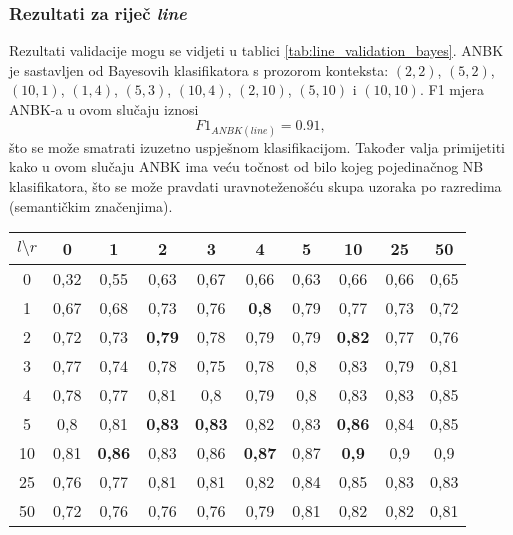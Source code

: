 \documentclass[10pt, a4paper]{article}
\begin{document}
\subsubsection{Rezultati za riječ \emph{line}} 
Rezultati validacije mogu se vidjeti u tablici \ref{tab:line_validation_bayes}.
ANBK je sastavljen od Bayesovih klasifikatora s prozorom konteksta: $(2,2)$,
$(5,2)$, $(10,1)$, $(1,4)$, $(5,3)$, $(10,4)$, $(2,10)$, $(5,10)$ i $(10,10)$.
F1 mjera ANBK-a u ovom slučaju iznosi
\begin{equation}
\label{eq:F1_ansambl_line}
F1_{ANBK(line)} = 0.91,
\end{equation}
što se može smatrati izuzetno uspješnom klasifikacijom. 
Također valja primijetiti kako u ovom slučaju ANBK ima veću točnost
od bilo kojeg pojedinačnog NB klasifikatora, što
se može pravdati uravnoteženošću skupa uzoraka po razredima (semantičkim značenjima).
\begin{table*}[!hbtp]
\caption{Validacijom dobivene F1 mjere NB klasifikatora s prozorom konteksta $(l,r)$ za riječ \emph{line}.}
\label{tab:line_validation_bayes}
\begin{center}
\begin{tabular}{|c||ccc|ccc|ccc|}
\hline
$l \setminus r$ & 0 & 1 & 2 & 3 & 4 & 5 & 10 & 25 & 50 \\
\hline\hline
0  & 0,32  & 0,55  & 0,63  & 0,67  & 0,66  & 0,63  & 0,66  & 0,66  & 0,65 \\  
1  & 0,67  & 0,68  & 0,73  & 0,76  & \textbf{0,8}   & 0,79  & 0,77  & 0,73  & 0,72 \\ 
2  & 0,72  & 0,73  & \textbf{0,79}  & 0,78  & 0,79  & 0,79  & \textbf{0,82}  & 0,77  & 0,76 \\\hline
3  &  0,77  & 0,74  & 0,78  & 0,75  & 0,78  & 0,8   & 0,83  & 0,79  & 0,81 \\ 
4  & 0,78  & 0,77  & 0,81  & 0,8   & 0,79  & 0,8   & 0,83  & 0,83  & 0,85 \\ 
5  & 0,8   & 0,81  & \textbf{0,83}  & \textbf{0,83}  & 0,82  & 0,83  & \textbf{0,86}  & 0,84  & 0,85 \\\hline 
10 & 0,81  & \textbf{0,86}  & 0,83  & 0,86  & \textbf{0,87}  & 0,87  & \textbf{0,9}   & 0,9   & 0,9  \\
25 & 0,76  & 0,77  & 0,81  & 0,81  & 0,82  & 0,84  & 0,85  & 0,83  & 0,83 \\ 
50 & 0,72  & 0,76  & 0,76  & 0,76  & 0,79  & 0,81  & 0,82  & 0,82  & 0,81 \\ 
\hline
\end{tabular}
\end{center}
\end{table*}
\end{document}
